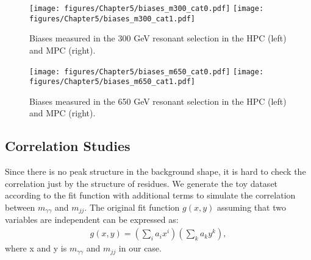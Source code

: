 \begin{figure}[h]
  \centering
  \texttt{[image: figures/Chapter5/biases\_m300\_cat0.pdf]}\hfil
  \texttt{[image: figures/Chapter5/biases\_m300\_cat1.pdf]}\hfil
  \caption{Biases measured in the 300 GeV resonant selection in the HPC (left) and MPC (right).}
  \label{fig:bkg_bias3}
\end{figure}
\begin{figure}[h]
  \centering
  \texttt{[image: figures/Chapter5/biases\_m650\_cat0.pdf]}\hfil
  \texttt{[image: figures/Chapter5/biases\_m650\_cat1.pdf]}\hfil
  \caption{Biases measured in the 650 GeV resonant selection in the HPC (left) and MPC (right).}
  \label{fig:bkg_bias4}
\end{figure}

\subsection{Correlation Studies}

Since there is no peak structure in the background shape, it is hard to check the correlation just by the structure of residues.
We generate the toy dataset according to the fit function with additional terms to simulate the correlation between $m_{\gamma\gamma}$ and $m_{jj}$.
The original fit function $g(x,y)$ assuming that two variables are independent can be expressed as:  
\begin{equation} \label{eq:2DfitFuncOri}
  \begin{aligned}
	g(x,y) = \left( \sum_{i} a_{i} x^{i}\right)\left( \sum_{k} a_{k} y^{k} \right),
  \end{aligned}
\end{equation}
where x and y is $m_{\gamma\gamma}$ and $m_{jj}$ in our case.

